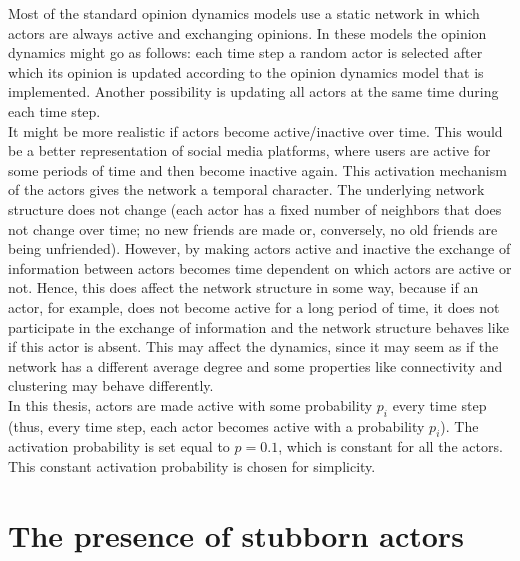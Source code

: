 \documentclass[11 pt , letterpaper , twoside , openright]{book}
\begin{document}
Most of the standard opinion dynamics models use a static network in which actors are always active and exchanging opinions. In these models the opinion dynamics might go as follows: each time step a random actor is selected after which its opinion is updated according to the opinion dynamics model that is implemented. Another possibility is updating all actors at the same time during each time step. \\
\newline
It might be more realistic if actors become active/inactive over time. This would be a better representation of social media platforms, where users are active for some periods of time and then become inactive again. This activation mechanism of the actors gives the network a temporal character. The underlying network structure does not change (each actor has a fixed number of neighbors that does not change over time; no new friends are made or, conversely, no old friends are being unfriended). However, by making actors active and inactive the exchange of information between actors becomes time dependent on which actors are active or not. Hence, this does affect the network structure in some way, because if an actor, for example, does not become active for a long period of time, it does not participate in the exchange of information and the network structure behaves like if this actor is absent. This may affect the dynamics, since it may seem as if the network has a different average degree and some properties like connectivity and clustering may behave differently. \\
\newline
In this thesis, actors are made active with some probability $p_i$ every time step (thus, every time step, each actor becomes active with a probability $p_i$). The activation probability is set equal to $p = 0.1$, which is constant for all the actors. This constant activation probability is chosen for simplicity.

\section{The presence of stubborn actors}\label{stubb}
\end{document}
